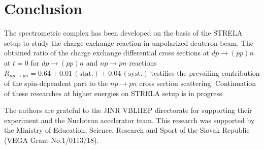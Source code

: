 \documentclass[twocolumn,epjc3]{svjour3}
\newcommand{\np}     {\ensuremath{np \rightarrow pn}\xspace}
\newcommand{\dpchex} {\ensuremath{dp \rightarrow (pp)n}\xspace}
\begin{document}
\section{Conclusion}
The spectrometric complex has been developed on the basis of the STRELA setup to
study the charge-exchange reaction in unpolarized deuteron beam. The obtained
ratio of the charge exchange differential cross sections at \dpchex at $t=0$ for
\dpchex and \np reactions
$R_{\np} = 0.64 \pm 0.01\,\mathrm{(stat.)} \pm 0.04\,\mathrm{(syst.)}$ testifies
the prevailing contribution of the spin-dependent part to the \np cross section
scattering. Continuation of these researches at higher energies on STRELA setup
is in progress.

\begin{acknowledgements}
  The authors are grateful to the JINR VBLHEP directorate for supporting their
  experiment and the Nuclotron accelerator team. This research was supported by
  the Ministry of Education, Science, Research and Sport of the Slovak Republic
  (VEGA Grant No.1/0113/18).
\end{acknowledgements}


\end{document}
